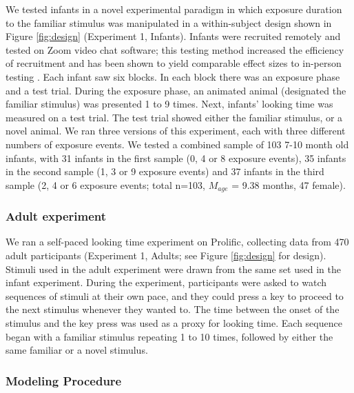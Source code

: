 \documentclass[
]{article}
\begin{document}
We tested infants in a novel experimental paradigm in which exposure duration to the familiar stimulus was manipulated in a within-subject design shown in Figure \ref{fig:design} (Experiment 1, Infants). Infants were recruited remotely and tested on Zoom video chat software; this testing method increased the efficiency of recruitment and has been shown to yield comparable effect sizes to in-person testing \cite{chuey2021moderated,chuey2024conducting}. Each infant saw six blocks. In each block there was an exposure phase and a test trial. During the exposure phase, an animated animal (designated the familiar stimulus) was presented 1 to 9 times. Next, infants' looking time was measured on a test trial. The test trial showed either the familiar stimulus, or a novel animal. We ran three versions of this experiment, each with three different numbers of exposure events. We tested a combined sample of 103 7-10 month old infants, with 31 infants in the first sample (0, 4 or 8 exposure events), 35 infants in the second sample (1, 3 or 9 exposure events) and 37 infants in the third sample (2, 4 or 6 exposure events; total n=103, \(M_{age}\) = 9.38 months, 47 female).

\hypertarget{adult-experiment}{%
\subsubsection{Adult experiment}\label{adult-experiment}}

We ran a self-paced looking time experiment on Prolific, collecting data from 470 adult participants (Experiment 1, Adults; see Figure \ref{fig:design} for design). Stimuli used in the adult experiment were drawn from the same set used in the infant experiment. During the experiment, participants were asked to watch sequences of stimuli at their own pace, and they could press a key to proceed to the next stimulus whenever they wanted to. The time between the onset of the stimulus and the key press was used as a proxy for looking time. Each sequence began with a familiar stimulus repeating 1 to 10 times, followed by either the same familiar or a novel stimulus.

\hypertarget{modeling-procedure}{%
\subsubsection{Modeling Procedure}\label{modeling-procedure}}
\end{document}
